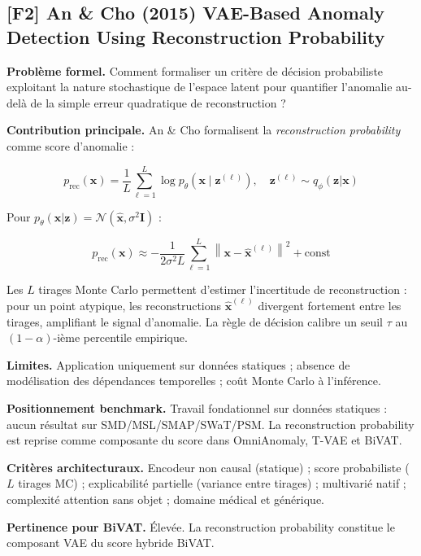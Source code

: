\documentclass[12pt,a4paper]{article}
\begin{document}
\subsection{[F2] An \& Cho (2015)  VAE-Based Anomaly Detection Using
Reconstruction Probability}

\textbf{Problème formel.} Comment formaliser un critère de décision probabiliste
exploitant la nature stochastique de l'espace latent pour quantifier l'anomalie
au-delà de la simple erreur quadratique de reconstruction ?

\textbf{Contribution principale.} An \& Cho formalisent la \textit{reconstruction
probability} comme score d'anomalie :

$$p_{\mathrm{rec}}(\mathbf{x}) = \frac{1}{L}\sum_{\ell=1}^{L}
\log p_\theta\!\left(\mathbf{x}\mid\mathbf{z}^{(\ell)}\right),
\quad \mathbf{z}^{(\ell)} \sim q_\phi(\mathbf{z}|\mathbf{x})$$

Pour $p_\theta(\mathbf{x}|\mathbf{z}) = \mathcal{N}(\hat{\mathbf{x}},
\sigma^2\mathbf{I})$ :

$$p_{\mathrm{rec}}(\mathbf{x}) \approx
-\frac{1}{2\sigma^2 L}\sum_{\ell=1}^{L}
\left\|\mathbf{x} - \hat{\mathbf{x}}^{(\ell)}\right\|^2 + \mathrm{const}$$

Les $L$ tirages Monte Carlo permettent d'estimer l'incertitude de reconstruction :
pour un point atypique, les reconstructions $\hat{\mathbf{x}}^{(\ell)}$ divergent
fortement entre les tirages, amplifiant le signal d'anomalie. La règle de décision
calibre un seuil $\tau$ au $(1-\alpha)$-ième percentile empirique.

\textbf{Limites.} Application uniquement sur données statiques ; absence de
modélisation des dépendances temporelles ; coût Monte Carlo à l'inférence.

\textbf{Positionnement benchmark.} Travail fondationnel sur données statiques :
aucun résultat sur SMD/MSL/SMAP/SWaT/PSM. La reconstruction probability est
reprise comme composante du score dans OmniAnomaly, T-VAE et BiVAT.

\textbf{Critères architecturaux.} Encodeur non causal (statique) ; score
probabiliste ($L$ tirages MC) ; explicabilité partielle (variance entre tirages) ;
multivarié natif ; complexité attention sans objet ; domaine médical et générique.

\textbf{Pertinence pour BiVAT.} Élevée. La reconstruction probability constitue
le composant VAE du score hybride BiVAT.

\end{document}
